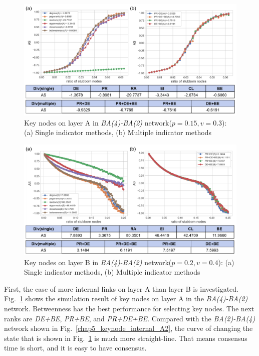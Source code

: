 \begin{figure}[!htb]
	\centering
	\includegraphics[width=\hsize]{figure/chap5_keynode_internal_A.png}
	\caption{Key nodes on layer A in \textit{BA(4)-BA(2)} network($p=0.15, v=0.3$):
		(a) Single indicator methods, (b) Multiple indicator methods}
	\label{chap5_keynode_internal_A}
\end{figure}
\begin{figure}[!htb]
	\centering
	\includegraphics[width=\hsize]{figure/chap5_keynode_internal_B.png}
	\caption{Key nodes on layer B in \textit{BA(4)-BA(2)} network($p=0.2, v=0.4$):
		(a) Single indicator methods, (b) Multiple indicator methods}
	\label{chap5_keynode_internal_B}
\end{figure}

First, the case of more internal links on layer A than layer B is investigated. Fig.~\ref{chap5_keynode_internal_A} shows the simulation result of key nodes on layer A in the \textit{BA(4)-BA(2)} network. Betweenness has the best performance for selecting key nodes. The next ranks are \textit{DE+BE}, \textit{PR+BE}, and \textit{PR+DE+BE}. Compared with the \textit{BA(2)-BA(4)} network shown in Fig.~\ref{chap5_keynode_internal_A2}, the curve of changing the state that is shown in Fig.~\ref{chap5_keynode_internal_A} is much more straight-line. That means consensus time is short, and it is easy to have consensus.

